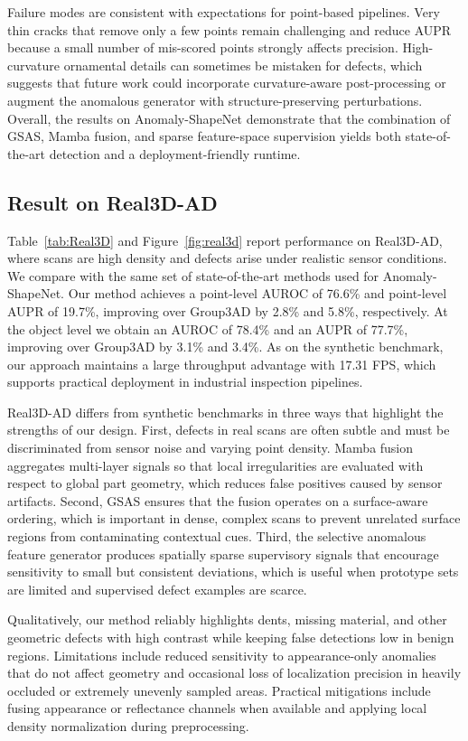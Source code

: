 Failure modes are consistent with expectations for point-based pipelines. Very thin cracks that remove only a few points remain challenging and reduce AUPR because a small number of mis-scored points strongly affects precision. High-curvature ornamental details can sometimes be mistaken for defects, which suggests that future work could incorporate curvature-aware post-processing or augment the anomalous generator with structure-preserving perturbations. Overall, the results on Anomaly-ShapeNet demonstrate that the combination of GSAS, Mamba fusion, and sparse feature-space supervision yields both state-of-the-art detection and a deployment-friendly runtime.

\subsection{Result on Real3D-AD}
\label{sec:results-real3d}

Table~\ref{tab:Real3D} and Figure~\ref{fig:real3d} report performance on Real3D-AD, where scans are high density and defects arise under realistic sensor conditions. We compare with the same set of state-of-the-art methods used for Anomaly-ShapeNet. Our method achieves a point-level AUROC of 76.6\% and point-level AUPR of 19.7\%, improving over Group3AD by 2.8\% and 5.8\%, respectively. At the object level we obtain an AUROC of 78.4\% and an AUPR of 77.7\%, improving over Group3AD by 3.1\% and 3.4\%. As on the synthetic benchmark, our approach maintains a large throughput advantage with 17.31 FPS, which supports practical deployment in industrial inspection pipelines.

Real3D-AD differs from synthetic benchmarks in three ways that highlight the strengths of our design. First, defects in real scans are often subtle and must be discriminated from sensor noise and varying point density. Mamba fusion aggregates multi-layer signals so that local irregularities are evaluated with respect to global part geometry, which reduces false positives caused by sensor artifacts. Second, GSAS ensures that the fusion operates on a surface-aware ordering, which is important in dense, complex scans to prevent unrelated surface regions from contaminating contextual cues. Third, the selective anomalous feature generator produces spatially sparse supervisory signals that encourage sensitivity to small but consistent deviations, which is useful when prototype sets are limited and supervised defect examples are scarce.

Qualitatively, our method reliably highlights dents, missing material, and other geometric defects with high contrast while keeping false detections low in benign regions. Limitations include reduced sensitivity to appearance-only anomalies that do not affect geometry and occasional loss of localization precision in heavily occluded or extremely unevenly sampled areas. Practical mitigations include fusing appearance or reflectance channels when available and applying local density normalization during preprocessing.

